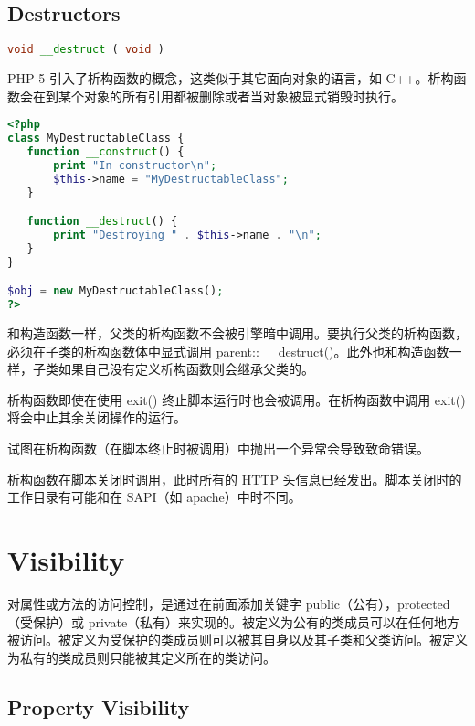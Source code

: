 \section{Destructors}









\begin{lstlisting}[language=PHP]
void __destruct ( void )
\end{lstlisting}

PHP 5 引入了析构函数的概念，这类似于其它面向对象的语言，如 C++。析构函数会在到某个对象的所有引用都被删除或者当对象被显式销毁时执行。


\begin{lstlisting}[language=PHP]
<?php
class MyDestructableClass {
   function __construct() {
       print "In constructor\n";
       $this->name = "MyDestructableClass";
   }

   function __destruct() {
       print "Destroying " . $this->name . "\n";
   }
}

$obj = new MyDestructableClass();
?>
\end{lstlisting}


和构造函数一样，父类的析构函数不会被引擎暗中调用。要执行父类的析构函数，必须在子类的析构函数体中显式调用 parent::\_\_destruct()。此外也和构造函数一样，子类如果自己没有定义析构函数则会继承父类的。

析构函数即使在使用 exit() 终止脚本运行时也会被调用。在析构函数中调用 exit() 将会中止其余关闭操作的运行。

试图在析构函数（在脚本终止时被调用）中抛出一个异常会导致致命错误。

析构函数在脚本关闭时调用，此时所有的 HTTP 头信息已经发出。脚本关闭时的工作目录有可能和在 SAPI（如 apache）中时不同。


\chapter{Visibility}

对属性或方法的访问控制，是通过在前面添加关键字 public（公有），protected（受保护）或 private（私有）来实现的。被定义为公有的类成员可以在任何地方被访问。被定义为受保护的类成员则可以被其自身以及其子类和父类访问。被定义为私有的类成员则只能被其定义所在的类访问。

\section{Property Visibility}


